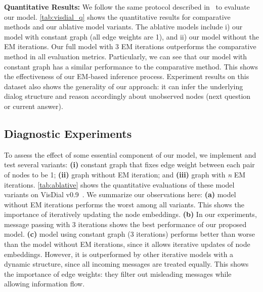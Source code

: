 \documentclass[10pt,twocolumn,letterpaper]{article}
\begin{document}
\noindent\textbf{Quantitative Results:}
We follow the same protocol described in~\cite{jain2018two} to evaluate our model. \autoref{tab:visdial_q} shows the quantitative results for comparative methods and our ablative model variants. The ablative models include i) our model with constant graph (all edge weights are 1), and ii) our model without the EM iterations. Our full model with 3 EM iterations outperforms the comparative method in all evaluation metrics. Particularly, we can see that our model with constant graph has a similar performance to the comparative method. This shows the effectiveness of our EM-based inference process. Experiment results on this dataset also shows the generality of our approach: it can infer the underlying dialog structure and reason accordingly about unobserved nodes (next question or current answer).




\vspace{-3pt}
\subsection{Diagnostic Experiments}\label{sec:as}
\vspace{-1pt}
To assess the effect of some essential component of our model, we implement and test several variants: \textbf{(i)} constant graph that fixes edge weight between each pair of nodes to be 1; \textbf{(ii)} graph without EM iteration; and \textbf{(iii)} graph with \textit{n} EM iterations. \autoref{tab:ablative} shows the quantitative evaluations of these model variants on VisDial v0.9~\cite{das2017visual}. We summarize our observations here: \textbf{(a)} model without EM iterations performs the worst among all variants. This shows the importance of iteratively updating the node embeddings. \textbf{(b)} In our experiments, message passing with 3 iterations shows the best performance of our proposed model. \textbf{(c)} model using constant graph (3 iterations) performs better than worse than the model without EM iterations, since it allows iterative updates of node embeddings. However, it is outperformed by other iterative models with a dynamic structure, since all incoming messages are treated equally. This shows the importance of edge weights: they filter out misleading messages while allowing information flow.
\end{document}
